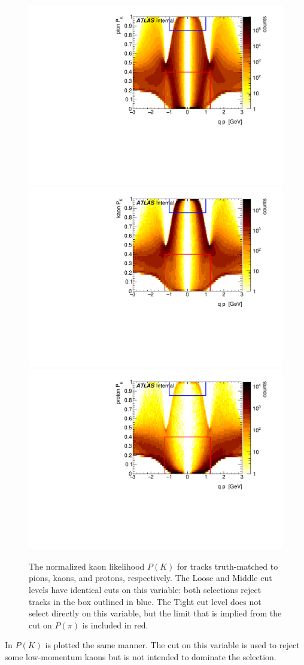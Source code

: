 \begin{figure}[t]
\begin{minipage}[t]{1.0\textwidth}
\centering
\includegraphics[width=.32\linewidth]{P_pion_K.pdf}
\includegraphics[width=.32\linewidth]{P_kaon_K.pdf}
\includegraphics[width=.32\linewidth]{P_proton_K.pdf}
\end{minipage}
\caption{The normalized kaon likelihood $P(K)$ for tracks truth-matched to pions, kaons, and protons, respectively. The Loose and Middle cut levels have identical cuts on this variable: both selections reject tracks in the box outlined in blue. The Tight cut level does not select directly on this variable, but the limit that is implied from the cut on $P(\pi)$ is included in red.}
\label{fig:prob_k}
\end{figure}

In  $P(K)$ is plotted the same manner.
The cut on this variable is used to reject some low-momentum kaons but is not intended to dominate the selection.

